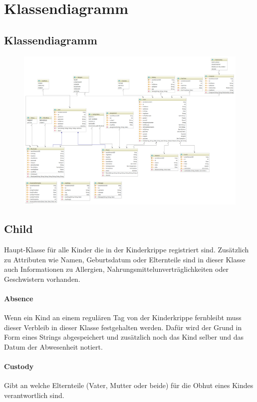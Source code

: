 

\newpage
\section{Klassendiagramm}

 \subsection{Klassendiagramm}
 \begin{figure}[ht!]
  \includegraphics[width = 160mm]{pictures/class_diagram_intellij_bright.png}
 \end{figure}

\newpage
\subsection{Child}
	Haupt-Klasse für alle Kinder die in der Kinderkrippe registriert sind. Zusätzlich zu Attributen wie Namen, Geburtsdatum oder Elternteile sind in dieser Klasse auch Informationen zu Allergien, Nahrungsmittelunverträglichkeiten oder Geschwistern vorhanden. 
\paragraph{Absence}
	Wenn ein Kind an einem regulären Tag von der Kinderkrippe fernbleibt muss dieser Verbleib in dieser Klasse festgehalten werden. Dafür wird der Grund in Form eines Strings abgespeichert und zusätzlich noch das Kind selber und das Datum der Abwesenheit notiert.
\paragraph{Custody}
	Gibt an welche Elternteile (Vater, Mutter oder beide) für die Obhut eines Kindes verantwortlich sind. 
